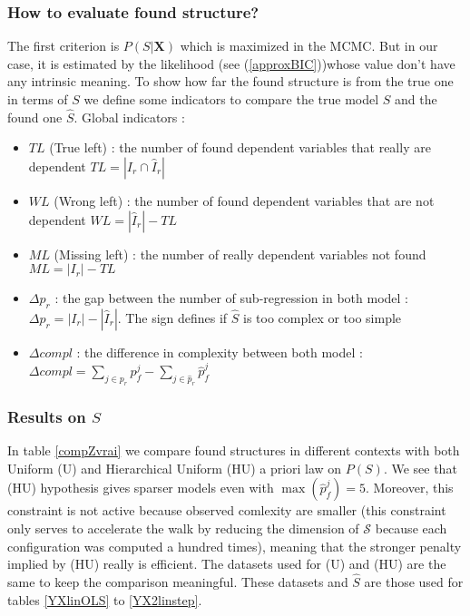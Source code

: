 \documentclass[11pt,a4paper]{article}
\begin{document}
		\subsubsection{How to evaluate found structure?}
			The first criterion is $P(S|\boldsymbol{X})$ which is maximized in the MCMC. But in our case, it is estimated by the likelihood (see (\ref{approxBIC}))whose value don't have any intrinsic meaning. To show how far the found structure is from the true one in terms of $S$ we define some indicators to compare the true model $S$ and the found one $\hat{S}$.
			Global indicators :
			\begin{itemize}
				\item $TL$ (True left) : the number of found dependent variables that really are dependent $TL=|I_r\cap \hat{I}_r|$ 
				\item $WL$ (Wrong left) : the number of found dependent variables that are not dependent $WL=|\hat{I}_r|-TL$
				\item $ML$ (Missing left) : the number of really dependent variables not found $ML=|I_r|-TL$
				\item $\Delta p_r$ : the gap between the number of sub-regression in both model : $\Delta p_r=|I_r|-|\hat{I}_r|$. The sign defines if $\hat{S}$ is too complex or too simple
				\item $\Delta compl$ : the difference in complexity between both model : $\Delta compl=\sum_{j \in p_r}p_f^j-\sum_{j \in \hat{p}_r}\hat{p}_f^j$
			\end{itemize}
		\subsubsection{Results on $S$}	\label{compZ}
In table \ref{compZvrai} we compare found structures in different contexts with both Uniform (U) and Hierarchical Uniform (HU) a priori law on $P(S)$. 
We see that (HU) hypothesis gives sparser models even with $\max (\hat{p}_f^j)=5$. Moreover, this constraint is not active because observed comlexity are smaller (this constraint only serves to accelerate the walk by reducing the dimension of $\mathcal{S}$ because each configuration was computed a hundred times), meaning that the stronger penalty implied by (HU) really is efficient. The datasets used for (U) and (HU) are the same to keep the comparison  meaningful. These datasets and $\hat{S}$ are those used for tables 
 \ref{YXlinOLS} to \ref{YX2linstep}.
 
\end{document}
